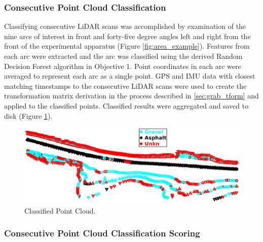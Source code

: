 \documentclass[numbered,pdftex]{ohio-etd}
\begin{document}
{{{{			\subsubsection{Consecutive Point Cloud Classification}\label{sec:consecutive_point_cloud_classification}{
			
				{Classifying consecutive LiDAR scans was accomplished by examination of the nine arcs of interest in front and forty-five degree angles left and right from the front of the experimental apparatus (Figure \ref{fig:area_example}). Features from each arc were extracted and the arc was classified using the derived Random Decision Forest algorithm in Objective 1. Point coordinates in each arc were averaged to represent each arc as a single point. GPS and IMU data with closest matching timestamps to the consecutive LiDAR scans were used to create the transformation matrix derivation in the process described in \ref{sec:grab_tform} and applied to the classified points. Classified results were aggregated and saved to disk (Figure \ref{fig:raw_classification_results}).}
				
				\begin{figure}[H]
					\centering
					\includegraphics[width=0.9\linewidth]{Defense_Images/raw_classification_results_v3}
					\caption[Classified Point Cloud]{Classified Point Cloud.}
					\label{fig:raw_classification_results}
				\end{figure}
				
			}
			
			\subsubsection{Consecutive Point Cloud Classification Scoring}\label{sec:consecutive_point_cloud_classification_scoring}{
				
}}}}}
\end{document}
